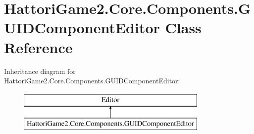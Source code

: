 \hypertarget{class_hattori_game2_1_1_core_1_1_components_1_1_g_u_i_d_component_editor}{}\section{Hattori\+Game2.\+Core.\+Components.\+G\+U\+I\+D\+Component\+Editor Class Reference}
\label{class_hattori_game2_1_1_core_1_1_components_1_1_g_u_i_d_component_editor}
Inheritance diagram for Hattori\+Game2.\+Core.\+Components.\+G\+U\+I\+D\+Component\+Editor\+:\begin{figure}[H]
\begin{center}
\leavevmode
\includegraphics[height=2.000000cm]{class_hattori_game2_1_1_core_1_1_components_1_1_g_u_i_d_component_editor}
\end{center}
\end{figure}
